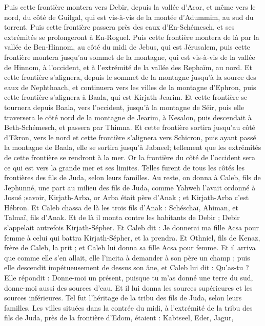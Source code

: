 \begin{multicols}{2}
Puis cette frontière montera vers Debir, depuis la vallée d'Acor, et même vers le nord, du côté de Guilgal, qui est vis-à-vis de la montée d'Adummim, au sud du torrent. Puis cette frontière passera près des eaux d'En-Schémesch, et ses extrémités se prolongeront à En-Roguel.
Puis cette frontière montera de là par la vallée de Ben-Hinnom, au côté du midi de Jebus, qui est Jérusalem, puis cette frontière montera jusqu'au sommet de la montagne, qui est vis-à-vis de la vallée de Hinnom, à l'occident, et à l'extrémité de la vallée des Rephaïm, au nord.
Et cette frontière s'alignera, depuis le sommet de la montagne jusqu'à la source des eaux de Nephthoach, et continuera vers les villes de la montagne d'Ephron, puis cette frontière s'alignera à Baala, qui est Kirjath-Jearim.
Et cette frontière se tournera depuis Baala, vers l'occident, jusqu'à la montagne de Séir, puis elle traversera le côté nord de la montagne de Jearim, à Kesalon, puis descendait à Beth-Schémesch, et passera par Thimna.
Et cette frontière sortira jusqu'au  côté d'Ekron, vers le nord et cette frontière s'alignera vers Schicron, puis ayant passé la montagne de Baala, elle se sortira jusqu'à Jabneel; tellement que les extrémités de cette frontière se rendront à la mer. 
Or la frontière du côté de l'occident sera ce qui est vers la grande mer et ses limites. Telles furent de tous les côtés les frontières des fils de Juda, selon leurs familles.
Au reste, on donna à Caleb, fils de Jephunné, une part au milieu des fils de Juda, comme Yahweh l'avait ordonné à Josué ;savoir, Kirjath-Arba, or Arba était père d'Anak ; et Kirjath-Arba c'est Hébron.
Et Caleb chassa de là les trois fils d'Anak : Schéschaï, Ahiman, et Talmaï, fils d'Anak.
Et de là il monta contre les habitants de Debir ; Debir s'appelait autrefois Kirjath-Sépher.
Et Caleb dit : Je donnerai ma fille Acsa pour femme à celui qui battra Kirjath-Sépher, et la prendra.
Et Othniel, fils de Kenaz, frère de Caleb, la prit ; et Caleb lui donna sa fille Acsa pour femme.
Et il arriva que comme elle s'en allait, elle l'incita à demander à son père un champ ; puis elle descendit impétueusement de dessus son âne, et Caleb lui dit : Qu'as-tu ? 
Elle répondit : Donne-moi un présent, puisque tu m'as donné une terre du sud, donne-moi aussi des sources d'eau. Et il lui donna les sources supérieures et les sources inférieures.
Tel fut l'héritage de la tribu des fils de Juda, selon leurs familles.
Les villes situées dans la contrée du midi, à l'extrémité de la tribu des fils de Juda, près de la frontière d'Edom, étaient : Kabtseel, Eder, Jagur,

\end{multicols}
